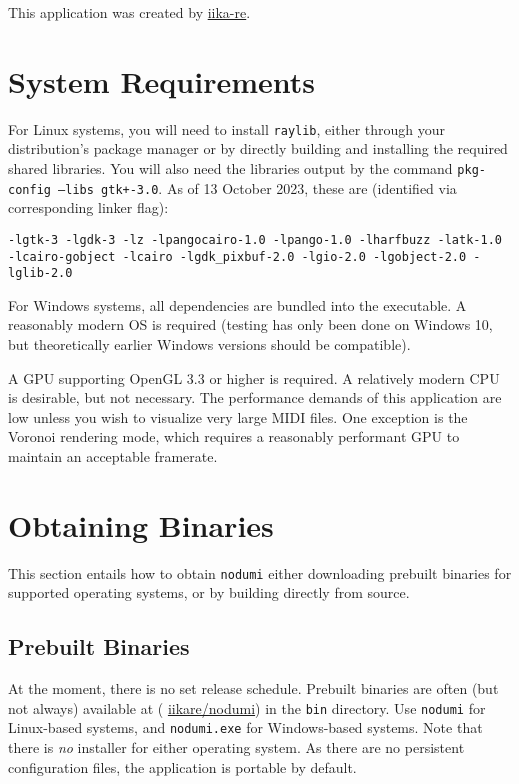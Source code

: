 \documentclass[english]{article}
\makeatletter
\newenvironment{restoretext}%
    {\@parboxrestore%
     \begin{adjustwidth}{}{\leftmargin}%
    }{\end{adjustwidth}
     }
\def\rcbegin{\begin{restoretext}\centering}
\def\rcend{\end{restoretext}}
\providecommand{\mi}[1]{\texttt{#1}}
\makeatother
\begin{document}
This application was created by \textcolor{lcol}{\href{https://iika.re}{iika-re}}.

\section{System Requirements}

For Linux systems, you will need to install \mi{raylib}, either through your distribution's package manager or by directly
building and installing the required shared libraries. You will also need the libraries output by the command
\mi{pkg-config --libs gtk+-3.0}. As of 13 October 2023, these are (identified via corresponding linker flag): 

\vspace{1em}

\rcbegin
  \mi{-lgtk-3 -lgdk-3 -lz -lpangocairo-1.0 -lpango-1.0 -lharfbuzz -latk-1.0
      -lcairo-gobject -lcairo -lgdk_pixbuf-2.0 -lgio-2.0 -lgobject-2.0 -lglib-2.0}
\rcend

\vspace{1em}

For Windows systems, all dependencies are bundled into the executable. A reasonably modern OS is required (testing has
only been done on Windows 10, but theoretically earlier Windows versions should be compatible).

A GPU supporting OpenGL 3.3 or higher is required. A relatively modern CPU is desirable, but not necessary.
The performance demands of this application are low unless you wish to visualize very large MIDI files.
One exception is the Voronoi rendering mode, which requires a reasonably performant GPU to maintain an acceptable framerate.

\section{Obtaining Binaries}
\label{sec:obtain}

This section entails how to obtain \mi{nodumi} \textendash{} either downloading prebuilt binaries for supported operating systems,
or by building directly from source.

\subsection{Prebuilt Binaries}

At the moment, there is no set release schedule. Prebuilt binaries are often (but not always) available at 
\textcolor{lcol}{(\raisebox{-0.1\height}{\faGithub} \href{https://github.com/iikare/nodumi}{iikare/nodumi})}
in the \mi{bin} directory. Use \mi{nodumi} for Linux-based systems, and \mi{nodumi.exe} for Windows-based systems.
Note that there is \textit{no} installer for either operating system. As there are no persistent configuration files,
the application is portable by default.
\end{document}
